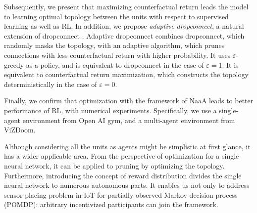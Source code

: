 Subsequently, we present that maximizing counterfactual return leads the model to learning optimal topology between the units with respect to supervised learning as well as RL.
In addition, we propose {\em adaptive dropconnect}, a natural extension of dropconnect \citep{wan2013regularization}.
Adaptive dropconnect combines dropconnect, which randomly masks the topology, with an adaptive algorithm, which prunes connections with less counterfactual return with higher probability.
It uses $\varepsilon$-greedy as a policy, and is equivalent to dropconnect in the case of $\varepsilon = 1$. It is equivalent to counterfactual return maximization, which constructs the topology deterministically in the case of $\varepsilon = 0$.

Finally, we confirm that optimization with the framework of NaaA leads to better performance of RL, with numerical experiments.
Specifically, we use a single-agent environment from Open AI gym, and a multi-agent environment from ViZDoom.

Although considering all the units as agents might be simplistic at first glance, it has a wider applicable area.
From the perspective of optimization for a single neural network, it can be applied to pruning by optimizing the topology.
Furthermore, introducing the concept of reward distribution divides the single neural network to numerous autonomous parts.
It enables us not only to address sensor placing problem in IoT for partially observed Markov decision process (POMDP): arbitrary incentivized participants can join the framework.
 
